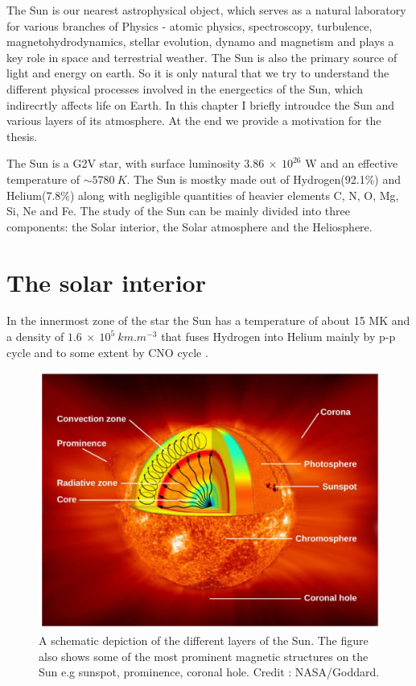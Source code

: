 

The Sun is our nearest astrophysical object, which serves as a natural laboratory for various branches of Physics - atomic physics, spectroscopy, turbulence, magnetohydrodynamics, stellar evolution, dynamo and magnetism and plays a key role in space and terrestrial weather. The Sun is also the primary source of light and energy on earth. So it is only natural that we try to understand the different physical processes involved in the energectics of the Sun, which indirecrtly affects life on Earth. In this chapter I briefly introudce the Sun and various layers of its atmosphere. At the end we provide a motivation for the thesis.

The Sun is a G2V star, with surface luminosity $3.86~\times~10^{26}$ W and an effective temperature of $\sim 5780~K$. The Sun is mostky made out of Hydrogen(92.1\%) and Helium(7.8\%) along with negligible quantities of heavier elements C, N, O, Mg, Si, Ne and Fe. The study of the Sun can be mainly divided into three components: the Solar interior, the Solar atmosphere and the Heliosphere.

\section{The solar interior}\label{solar_int}

In the innermost zone of the star the Sun has a temperature of about 15 MK and a density of $1.6~\times~10^{5}~km.m^{-3}$ that fuses Hydrogen into Helium mainly by p-p cycle \citep{bethe38} and to some extent by CNO cycle \citep{bethe39}. 

\begin{figure}[h!]
    \centering
    \includegraphics[width = 0.8\linewidth]{Figures/solar_int.png}
    \caption{A schematic depiction of the different layers of the Sun. The figure also shows some of the most prominent magnetic structures on the Sun e.g sunspot, prominence, coronal hole. Credit : NASA/Goddard. }
    \label{fig_solar_int}
\end{figure}

